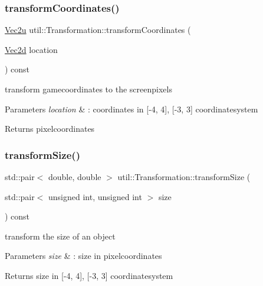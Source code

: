 \subsubsection{\texorpdfstring{transform\+Coordinates()}{transformCoordinates()}}
{\footnotesize\ttfamily \mbox{\hyperlink{classutil_1_1_vec2}{Vec2u}} util\+::\+Transformation\+::transform\+Coordinates (\begin{DoxyParamCaption}\item[{\mbox{\hyperlink{classutil_1_1_vec2}{Vec2d}}}]{location }\end{DoxyParamCaption}) const}



transform gamecoordinates to the screenpixels 


\begin{DoxyParams}{Parameters}
{\em location} & \+: coordinates in \mbox{[}-\/4, 4\mbox{]}, \mbox{[}-\/3, 3\mbox{]} coordinatesystem \\
\hline
\end{DoxyParams}
\begin{DoxyReturn}{Returns}
pixelcoordinates 
\end{DoxyReturn}
\mbox{\label{classutil_1_1_transformation_a7d6caddc65a3fa10fa98555dc3f96ea5}} 
\subsubsection{\texorpdfstring{transform\+Size()}{transformSize()}\hspace{0.1cm}{\footnotesize\ttfamily [1/2]}}
{\footnotesize\ttfamily std\+::pair$<$ double, double $>$ util\+::\+Transformation\+::transform\+Size (\begin{DoxyParamCaption}\item[{std\+::pair$<$ unsigned int, unsigned int $>$}]{size }\end{DoxyParamCaption}) const}

transform the size of an object 
\begin{DoxyParams}{Parameters}
{\em size} & \+: size in pixelcoordinates \\
\hline
\end{DoxyParams}
\begin{DoxyReturn}{Returns}
size in \mbox{[}-\/4, 4\mbox{]}, \mbox{[}-\/3, 3\mbox{]} coordinatesystem 
\end{DoxyReturn}
\mbox{\label{classutil_1_1_transformation_aedd442f8fde937eec692f4f07c2d7861}} 
